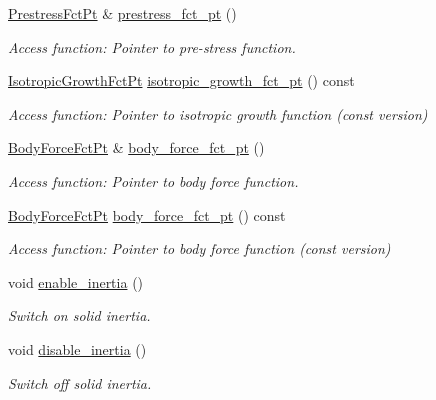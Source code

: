 \begin{DoxyCompactItemize}
\hyperlink{classoomph_1_1PVDEquationsBase_a457b9ffb2b62ecc0cf5fe61cf28e98e5}{Prestress\+Fct\+Pt} \& \hyperlink{classoomph_1_1PVDEquationsBase_a20ad29e9343f858dbf3440578c82711d}{prestress\+\_\+fct\+\_\+pt} ()
\begin{DoxyCompactList}\small\item\em Access function\+: Pointer to pre-\/stress function. \end{DoxyCompactList}\item 
\hyperlink{classoomph_1_1PVDEquationsBase_a59fc7069e0330c399ff53aebb6c67729}{Isotropic\+Growth\+Fct\+Pt} \hyperlink{classoomph_1_1PVDEquationsBase_a8c4d58ce5d34f4b07886f11c67654733}{isotropic\+\_\+growth\+\_\+fct\+\_\+pt} () const
\begin{DoxyCompactList}\small\item\em Access function\+: Pointer to isotropic growth function (const version) \end{DoxyCompactList}\item 
\hyperlink{classoomph_1_1PVDEquationsBase_aa0d7dc7279aff03dfcc3ad35bb6653be}{Body\+Force\+Fct\+Pt} \& \hyperlink{classoomph_1_1PVDEquationsBase_a4086278ead7513f26bec549f5eaf4e15}{body\+\_\+force\+\_\+fct\+\_\+pt} ()
\begin{DoxyCompactList}\small\item\em Access function\+: Pointer to body force function. \end{DoxyCompactList}\item 
\hyperlink{classoomph_1_1PVDEquationsBase_aa0d7dc7279aff03dfcc3ad35bb6653be}{Body\+Force\+Fct\+Pt} \hyperlink{classoomph_1_1PVDEquationsBase_a8692a8eccccf96efefa98a2ed3e92446}{body\+\_\+force\+\_\+fct\+\_\+pt} () const
\begin{DoxyCompactList}\small\item\em Access function\+: Pointer to body force function (const version) \end{DoxyCompactList}\item 
void \hyperlink{classoomph_1_1PVDEquationsBase_af4c1805ff3722f048e9c4ab3380f8838}{enable\+\_\+inertia} ()
\begin{DoxyCompactList}\small\item\em Switch on solid inertia. \end{DoxyCompactList}\item 
void \hyperlink{classoomph_1_1PVDEquationsBase_a6768179db1eb68c90c06976329d2fbdd}{disable\+\_\+inertia} ()
\begin{DoxyCompactList}\small\item\em Switch off solid inertia. \end{DoxyCompactList}\item 

\end{DoxyCompactItemize}
